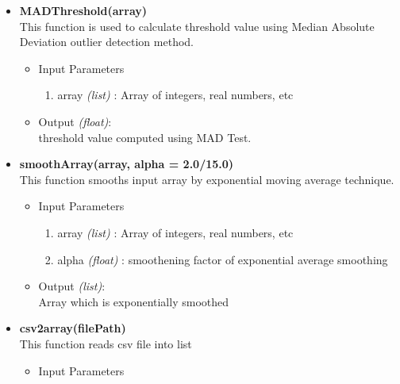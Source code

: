 \begin{itemize}
\begin{itemize}
	\end{itemize}
 
 
 \item \textbf{MADThreshold(array)} \\
 
 This function is used to calculate threshold value using Median Absolute Deviation outlier detection method.
 
 \begin{itemize}
	  \item Input Parameters
	  
	  \begin{enumerate}
	    \item array \textit{(list)} : Array of integers, real numbers, etc
	    \end{enumerate}

	  \item Output \textit{(float)}: \\
	  threshold value computed using MAD Test.
	  
	\end{itemize}
 
 \item \textbf{smoothArray(array, alpha = 2.0/15.0)} \\
 This function smooths input array by exponential moving average technique.
 
 \begin{itemize}
	  \item Input Parameters
	  
	  \begin{enumerate}
	    \item array \textit{(list)} : Array of integers, real numbers, etc
	    \item alpha \textit{(float)} : smoothening factor of exponential average smoothing
	    \end{enumerate}

	  \item Output \textit{(list)}: \\
	  Array which is exponentially smoothed
	  
	\end{itemize}
 
 
 \item \textbf{csv2array(filePath) }\\
 
  This function reads csv file into list
 
 \begin{itemize}
	  \item Input Parameters
	  

\end{itemize}
\end{itemize}
